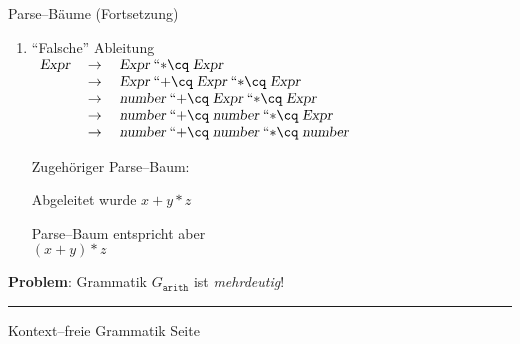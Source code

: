 \begin{slide}{}
\normalsize

\begin{center}
Parse--B\"aume (Fortsetzung)
\end{center}
\vspace*{0.5cm}

\footnotesize
\begin{enumerate}
\item ``Falsche'' Ableitung \\[0.3cm]
\hspace*{1.3cm} 
$\begin{array}{lcl}
\textsl{Expr} & \;\rightarrow\; & \textsl{Expr}\; ``\mathtt{*}\cq\; \textsl{Expr} \\
              & \;\rightarrow\; & \textsl{Expr}\; ``\mathtt{+}\cq\; \textsl{Expr}\; ``\mathtt{*}\cq\; \textsl{Expr} \\
              & \;\rightarrow\; & \textsl{number}\; ``\mathtt{+}\cq\; \textsl{Expr}\; ``\mathtt{*}\cq\; \textsl{Expr} \\
              & \;\rightarrow\; & \textsl{number}\; ``\mathtt{+}\cq\; \textsl{number}\; ``\mathtt{*}\cq\; \textsl{Expr} \\
              & \;\rightarrow\; & \textsl{number}\; ``\mathtt{+}\cq\; \textsl{number}\; ``\mathtt{*}\cq\; \textsl{number} \\
\end{array}
$
\vspace*{0.5cm}

Zugeh\"origer Parse--Baum: \\[0.8cm]
\hspace*{1.3cm} 

Abgeleitet wurde $x + y * z$

Parse--Baum entspricht aber \\[0.3cm]
\hspace*{1.3cm} $(x + y) * z$
\end{enumerate}

\textbf{Problem}: Grammatik $G_{\mathtt{arith}}$ ist \emph{mehrdeutig}!

\vspace*{\fill}
\tiny \addtocounter{mypage}{1}
\rule{17cm}{1mm}
Kontext--freie Grammatik  \hspace*{\fill} Seite 
\end{slide}


